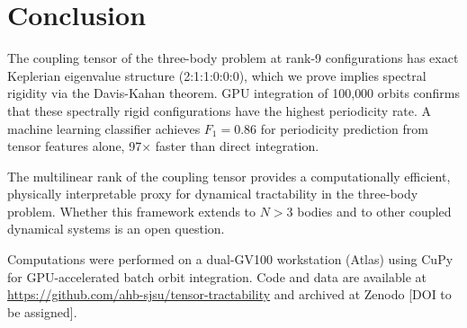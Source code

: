 \documentclass[aps,pre,twocolumn,superscriptaddress,floatfix]{revtex4-2}
\begin{document}
\section{Conclusion}

The coupling tensor of the three-body problem at rank-9 configurations
has exact Keplerian eigenvalue structure (2:1:1:0:0:0), which we prove
implies spectral rigidity via the Davis-Kahan theorem. GPU integration
of 100{,}000 orbits confirms that these spectrally rigid configurations
have the highest periodicity rate. A machine learning classifier
achieves $F_1 = 0.86$ for periodicity prediction from tensor features
alone, 97$\times$ faster than direct integration.

The multilinear rank of the coupling tensor provides a computationally
efficient, physically interpretable proxy for dynamical tractability
in the three-body problem. Whether this framework extends to $N > 3$
bodies and to other coupled dynamical systems is an open question.

\begin{acknowledgments}
Computations were performed on a dual-GV100 workstation (Atlas)
using CuPy for GPU-accelerated batch orbit integration. Code and
data are available at \url{https://github.com/ahb-sjsu/tensor-tractability}
and archived at Zenodo [DOI to be assigned].
\end{acknowledgments}


\end{document}
